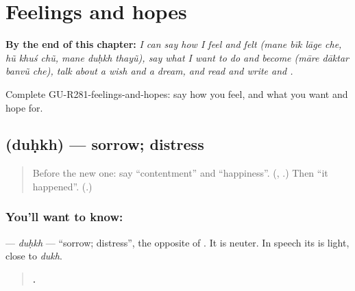 
\chapter{Feelings and hopes}
\label{ch:gu-feelings-and-hopes}

\begin{chapteropening}
\textbf{By the end of this chapter:} \emph{I can say how I feel and felt (mane bīk lāge che, hũ khuś chũ, mane duḥkh thayũ), say what I want to do and become (māre dāktar banvũ che), talk about a wish and a dream, and read and write  and .}

Complete GU-R281-feelings-and-hopes: say how you feel, and what you want and hope for.
\end{chapteropening}

\section[\texorpdfstring{\gu{દુઃખ} (duḥkh)}{દુઃખ (duḥkh)}]{ (duḥkh) — sorrow; distress}

\label{lesson:GU-C281-dukh}



\begin{quote}
Before the new one: say \textquotedblleft{}contentment\textquotedblright{} and \textquotedblleft{}happiness\textquotedblright{}. (\textbf{}, \textbf{}.) Then \textquotedblleft{}it happened\textquotedblright{}. (\textbf{}.)
\end{quote}

\subsection*{You'll want to know: }
\textbf{} — \emph{duḥkh} — \textquotedblleft{}sorrow; distress\textquotedblright{}, the opposite of \textbf{}. It is neuter. In speech its \textbf{} is light, close to \emph{dukh}.

\begin{quote}
\textbf{  .}
\end{quote}


